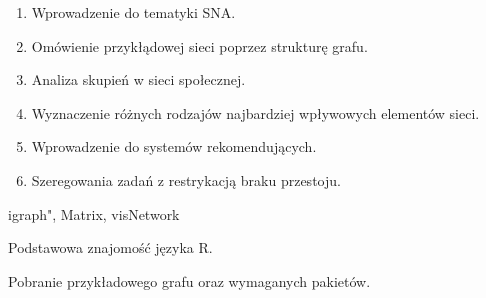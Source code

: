\documentclass[\main/boa.tex]{subfiles}
\begin{document}
\planwarsztatu
\begin{enumerate}
\item Wprowadzenie do tematyki SNA.
\item Omówienie przykłądowej sieci poprzez strukturę grafu.
\item Analiza skupień w sieci społecznej.
\item Wyznaczenie różnych rodzajów najbardziej wpływowych elementów sieci.
\item Wprowadzenie do systemów rekomendujących.
\item Szeregowania zadań z restrykacją braku przestoju.
\end{enumerate}	 

\pakiety igraph", Matrix, visNetwork

\umiejetnosci Podstawowa znajomość języka R.

\wymagania Pobranie przykładowego grafu oraz wymaganych pakietów.
\end{document}
